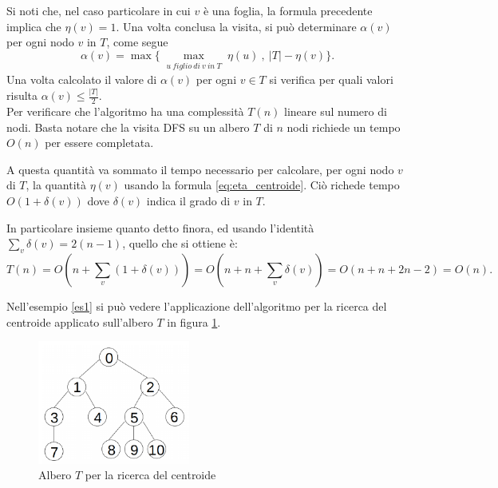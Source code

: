 Si noti che, nel caso particolare in cui $v$ è una foglia, la formula precedente implica che $\eta(v)=1$.
Una volta conclusa la visita, si pu\`o determinare $ \alpha(v) $ per ogni nodo $ v $ in $ T $, come segue
\[ \alpha(v) = \max\{ \max_{\substack{u \ figlio \ di \ v \ in \ T}} {\eta(u)} \ , \ |T| - \eta(v) \}. \]
\noindent Una volta calcolato il valore di $ \alpha(v) $ per ogni $  v \in T $ si verifica per quali valori  risulta $\alpha(v)\le\frac{|T|}{2}$.\\
Per verificare che l'algoritmo ha una complessit\`a $ T(n) $ lineare sul numero di nodi.
Basta notare che la visita DFS su un albero $ T $ di $ n $ nodi richiede un tempo $ O(n) $ per essere completata.

A questa quantità va sommato il tempo necessario per calcolare, per ogni nodo $v$ di $T$, la quantità $\eta(v)$ usando la formula \eqref{eq:eta_centroide}. Ciò richede tempo $O(1 + \delta(v))$ dove $\delta(v)$ indica il grado di $v$ in $T$.

In particolare insieme quanto detto finora, ed usando l'identità $\sum_{v} \delta(v) = 2(n-1)$, quello che si ottiene \`e:
\[  T(n) = O(n + \sum_{v}(1+\delta(v)))= O(n + n + \sum_{v}\delta(v)) = O(n+n+2n-2)=O(n).
\] 

Nell'esempio \ref{es1} si pu\`o vedere l'applicazione dell'algoritmo per la ricerca del centroide applicato sull'albero $ T $ in figura \ref{fig:2}.
	\begin{figure}[htbp]
		\centering
		\includegraphics[width=5cm]{capitolo3/grafo2}
		\caption{Albero $ T $  per la ricerca del centroide} 
		\label{fig:2}
\end{figure}

